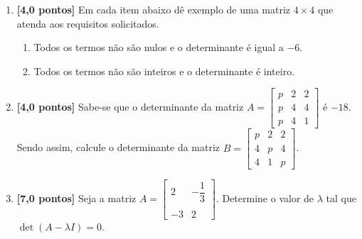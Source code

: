 \documentclass[12pt,a4paper]{article}
\begin{document}
\begin{enumerate}
  \item \textbf{[4,0 pontos]} Em cada item abaixo dê exemplo de uma matriz $4\times 4$ que atenda aos requisitos solicitados.
    \begin{enumerate}
      \item Todos os termos não são nulos e o determinante é igual a $-6$.
      \item Todos os termos não são inteiros e o determinante é inteiro.
    \end{enumerate}
    
  \item \textbf{[4,0 pontos]} Sabe-se que o determinante da matriz
    $A=\begin{bmatrix}
      p & 2 & 2\\
      p & 4 & 4\\
      p & 4 & 1
    \end{bmatrix}$ é $-18$. Sendo assim, calcule
    o determinante da matriz
    $B=\begin{bmatrix}
      p & 2 & 2\\
      4 & p & 4\\
      4 & 1 & p
    \end{bmatrix}$.
    
  \item \textbf{[7,0 pontos]} Seja a matriz
    $A=\begin{bmatrix} 2 & -\dfrac{1}{3}\\ \\ -3 & 2\end{bmatrix}$.
    Determine o valor de $\lambda$ tal que $\det(A-\lambda I) = 0$.

  \end{enumerate}
\end{document}
